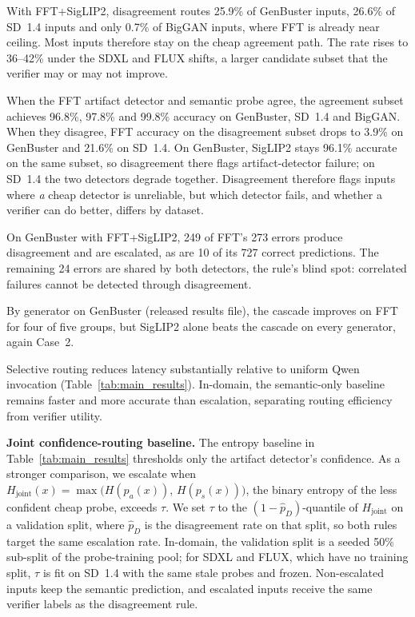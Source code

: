 \documentclass{ieeeaccess}
\begin{document}
With FFT+SigLIP2, disagreement routes 25.9\% of GenBuster inputs, 26.6\% of SD~1.4
inputs and only 0.7\% of BigGAN inputs, where FFT is already near ceiling. Most inputs therefore stay on the cheap agreement path. The rate rises to 36--42\% under the SDXL and FLUX shifts, a larger candidate subset that the verifier may or may not improve.

When the FFT artifact detector and semantic probe agree, the agreement subset achieves
96.8\%, 97.8\% and 99.8\% accuracy on GenBuster, SD~1.4 and BigGAN.
When they disagree, FFT accuracy on the disagreement subset drops to
3.9\% on GenBuster and 21.6\% on SD~1.4. On GenBuster, SigLIP2 stays 96.1\% accurate on the same subset, so disagreement there flags artifact-detector failure; on SD~1.4 the two detectors degrade together. Disagreement therefore flags inputs where \emph{a} cheap detector is unreliable, but which detector fails, and whether a verifier can do better, differs by dataset.

On GenBuster with FFT+SigLIP2, 249 of FFT's 273 errors produce disagreement and are
escalated, as are 10 of its 727 correct predictions. The remaining 24 errors are shared by both detectors, the rule's blind spot: correlated failures cannot be detected through disagreement.

By generator on GenBuster (released results file), the cascade improves on FFT for four of five groups, but SigLIP2 alone beats the cascade on every generator, again Case~2.

Selective routing reduces latency substantially relative to uniform Qwen invocation
(Table~\ref{tab:main_results}). In-domain, the semantic-only baseline remains faster and
more accurate than escalation, separating routing efficiency from verifier utility.

\textbf{Joint confidence-routing baseline.} The entropy baseline in Table~\ref{tab:main_results} thresholds only the artifact detector's confidence. As a stronger comparison, we escalate when $H_{\text{joint}}(x) = \max\big(H(p_a(x)),\, H(p_s(x))\big)$, the binary entropy of the less confident cheap probe, exceeds $\tau$. We set $\tau$ to the $(1-\hat{p}_D)$-quantile of $H_{\text{joint}}$ on a validation split, where $\hat{p}_D$ is the disagreement rate on that split, so both rules target the same escalation rate. In-domain, the validation split is a seeded 50\% sub-split of the probe-training pool; for SDXL and FLUX, which have no training split, $\tau$ is fit on SD~1.4 with the same stale probes and frozen. Non-escalated inputs keep the semantic prediction, and escalated inputs receive the same verifier labels as the disagreement rule.
\end{document}

